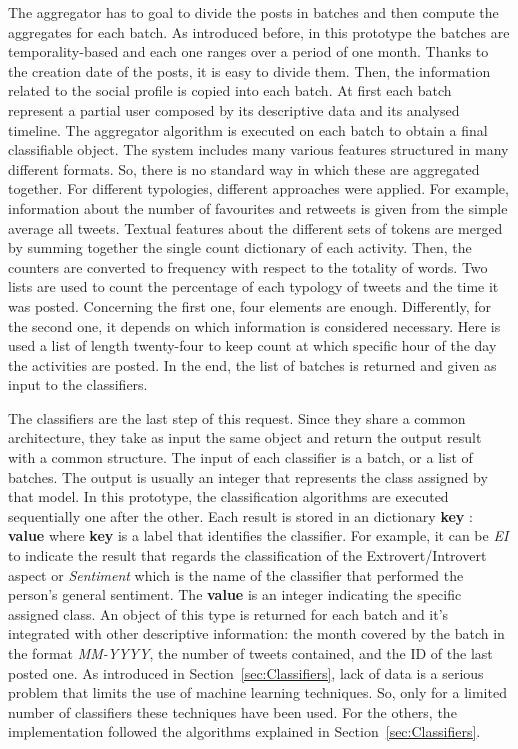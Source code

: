 The aggregator has to goal to divide the posts in batches and then compute the aggregates for each batch.
As introduced before, in this prototype the batches are temporality-based and each one ranges over a period of one month.
Thanks to the creation date of the posts, it is easy to divide them. Then, the information related to the social profile is copied into each batch.
At first each batch represent a partial user composed by its descriptive data and its analysed timeline.
The aggregator algorithm is executed on each batch to obtain a final classifiable object.
The system includes many various features structured in many different formats. So, there is no standard way in which these are aggregated together.
For different typologies, different approaches were applied.
For example, information about the number of favourites and retweets is given from the simple average all tweets. Textual features about the different sets of tokens are merged by summing together the single count dictionary of each activity. Then, the counters are converted to frequency with respect to the totality of words. 
Two lists are used to count the percentage of each typology of tweets and the time it was posted. Concerning the first one, four elements are enough. Differently, for the second one, it depends on which information is considered necessary.
Here is used a list of length twenty-four to keep count at which specific hour of the day the activities are posted.
In the end, the list of batches is returned and given as input to the classifiers.

The classifiers are the last step of this request. Since they share a common architecture, they take as input the same object and return the output result with a common structure.
The input of each classifier is a batch, or a list of batches. The output is usually an integer that represents the class assigned by that model.
In this prototype, the classification algorithms are executed sequentially one after the other. Each result is stored in an dictionary {\textbf{key} : \textbf{value}} where \textbf{key} is a label that identifies the classifier. For example, it can be \textit{EI} to indicate the result that regards the classification of the Extrovert/Introvert aspect or \textit{Sentiment} which is the name of the classifier that performed the person's general sentiment.
The \textbf{value} is an integer indicating the specific assigned class.
An object of this type is returned for each batch and it's integrated with other descriptive information: the month covered by the batch in the format \textit{MM-YYYY}, the number of tweets contained, and the ID of the last posted one.
As introduced in Section~\ref{sec:Classifiers}, lack of data is a serious problem that limits the use of machine learning techniques. So, only for a limited number of classifiers these techniques have been used.
For the others, the implementation followed the algorithms explained in Section~\ref{sec:Classifiers}. 

